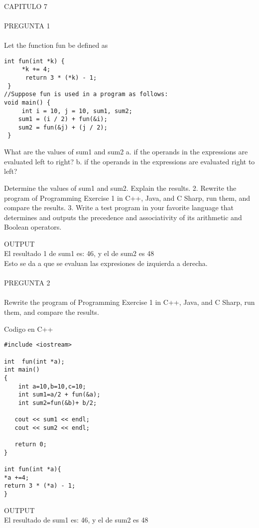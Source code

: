 \documentclass[../main.tex]{subfiles}
\begin{document}
\paragraph{ }CAPITULO 7
\paragraph{ }PREGUNTA 1
\paragraph{ }
Let the function fun be defined as
\begin{lstlisting}
int fun(int *k) { 
	 *k += 4;
	  return 3 * (*k) - 1;
 }
//Suppose fun is used in a program as follows:
void main() {
	 int i = 10, j = 10, sum1, sum2;
	sum1 = (i / 2) + fun(&i);
	sum2 = fun(&j) + (j / 2);
 }
\end{lstlisting}

What are the values of sum1 and sum2 a. if the operands in the expressions are evaluated left to right? b. if the operands in the expressions are evaluated right to left?

Determine the values of sum1 and sum2. Explain the results. 2. Rewrite the program of Programming Exercise 1 in C++, Java, and C Sharp, run them, and compare the results. 3. Write a test program in your favorite language that determines and outputs the precedence and associativity of its arithmetic and Boolean operators.

OUTPUT\\El resultado 1 de sum1 es: 46, y el de sum2 es 48\\
Esto se da a que se evaluan las expresiones de izquierda a derecha.

\paragraph{ }PREGUNTA 2
\paragraph{ }
Rewrite the program of Programming Exercise 1 in C++, Java, and C Sharp, run them, and compare the results.

Codigo en C++
\begin{lstlisting}[frame=single] 
#include <iostream>

int  fun(int *a); 
int main()
{
    int a=10,b=10,c=10;
    int sum1=a/2 + fun(&a);
    int sum2=fun(&b)+ b/2;
    
   cout << sum1 << endl; 
   cout << sum2 << endl; 
   
   return 0;
}

int fun(int *a){
*a +=4;
return 3 * (*a) - 1;
}

\end{lstlisting}
OUTPUT\\ El resultado de sum1 es: 46, y el de sum2 es 48\\
\end{document}
